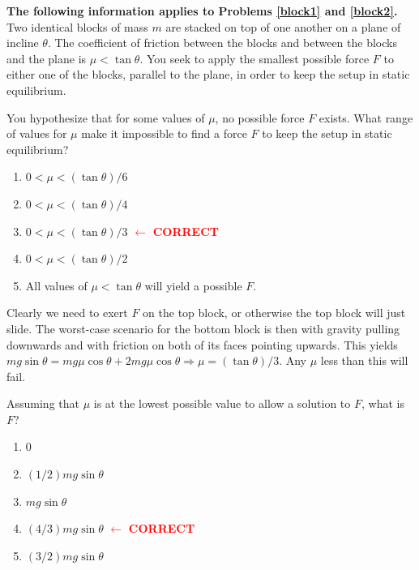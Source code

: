 \documentclass[11pt]{scrartcl}
\begin{document}
\textbf{The following information applies to Problems \ref{block1} and \ref{block2}.}\\
Two identical blocks of mass $m$ are stacked on top of one another on a plane of incline $\theta$. The coefficient of friction between the blocks and between the blocks and the plane is $\mu<\tan\theta$. You seek to apply the smallest possible force $F$ to either one of the blocks, parallel to the plane, in order to keep the setup in static equilibrium.

\begin{prob}\label{block1}
    You hypothesize that for some values of $\mu$, no possible force $F$ exists. What range of values for $\mu$ make it impossible to find a force $F$ to keep the setup in static equilibrium?
    \begin{enumerate}[label = (\Alph*)]
\item $0<\mu<(\tan\theta)/6$
\item $0<\mu<(\tan\theta)/4$
\item $0<\mu<(\tan\theta)/3$ \textcolor{red}{$\leftarrow$ \textbf{CORRECT}}
\item $0<\mu<(\tan\theta)/2$
\item All values of $\mu<\tan\theta$ will yield a possible $F$.
\end{enumerate}
\end{prob}

\begin{sol}
    Clearly we need to exert $F$ on the top block, or otherwise the top block will just slide. The worst-case scenario for the bottom block is then with gravity pulling downwards and with friction on both of its faces pointing upwards. This yields $mg\sin\theta=mg\mu\cos\theta+2mg\mu\cos\theta\Rightarrow \mu=(\tan\theta)/3$. Any $\mu$ less than this will fail. 
\end{sol}

\begin{prob}\label{block2}
    Assuming that $\mu$ is at the lowest possible value to allow a solution to $F$, what is $F$?
    \begin{enumerate}[label = (\Alph*)]
\item 0
\item $(1/2)mg\sin\theta$
\item $mg\sin\theta$
\item $(4/3)mg\sin\theta$ \textcolor{red}{$\leftarrow$ \textbf{CORRECT}}
\item $(3/2)mg\sin\theta$
\end{enumerate}
\end{prob}
\end{document}
